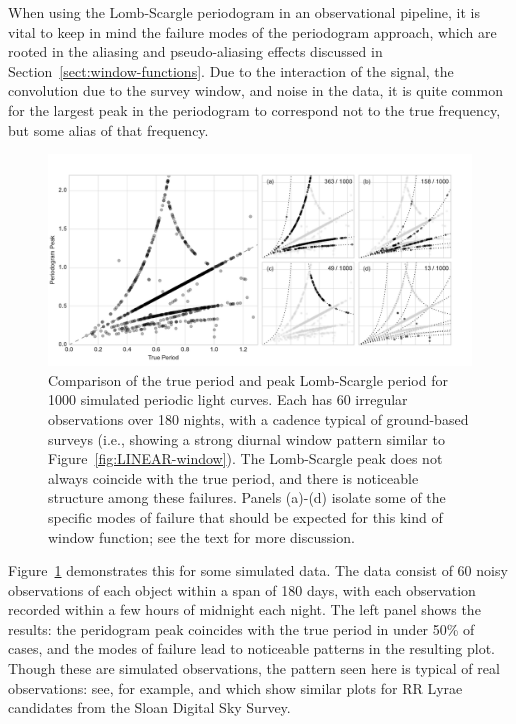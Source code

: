 \documentclass[preprint]{aastex}
\newcommand{\fig}[1]{Figure~\ref{fig:#1}}
\newcommand{\figlabel}[1]{\label{fig:#1}}
\newcommand{\Sect}[1]{Section~\ref{sect:#1}}
\newcommand{\sect}[1]{\Sect{#1}}
\begin{document}
When using the Lomb-Scargle periodogram in an observational pipeline, it is
vital to keep in mind the failure modes of the periodogram approach, which
are rooted in the aliasing and pseudo-aliasing effects discussed in
\sect{window-functions}.
Due to the interaction of the signal, the convolution due to the survey window,
and noise in the data, it is quite common for the largest peak in the
periodogram to correspond not to the true frequency, but some alias of that
frequency.

\begin{figure}[ht]
  \centering
  \includegraphics[width=\textwidth]{fig25_failure_modes}
  \caption{Comparison of the true period and peak Lomb-Scargle period for
    1000 simulated periodic light curves.
    Each has 60 irregular observations over 180 nights,
    with a cadence typical of ground-based surveys (i.e., showing a strong
    diurnal window pattern similar to \fig{LINEAR-window}).
    The Lomb-Scargle peak does not always coincide with the true period,
    and there is noticeable structure among these failures.
    Panels (a)-(d) isolate some of the specific modes of failure that should
    be expected for this kind of window function;
    see the text for more discussion.
    \figlabel{failure-modes}}
\end{figure}

\fig{failure-modes} demonstrates this for some simulated data.
The data consist of 60 noisy observations of each object within a span of
180 days, with each observation recorded within a few hours of midnight
each night.
The left panel shows the results: the peridogram peak coincides with the true
period in under 50\% of cases, and the modes of failure lead to noticeable
patterns in the resulting plot.
Though these are simulated observations, the pattern seen here is typical of
real observations: see, for example, \citet{VanderPlas2015}
and \citet{Long2016} which show similar plots for RR Lyrae candidates from
the Sloan Digital Sky Survey.
\end{document}
